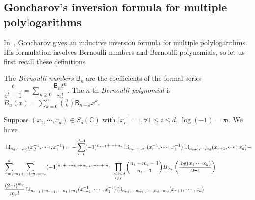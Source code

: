 \subsection{Goncharov's inversion formula for multiple polylogarithms}

In~\cite{Goncharov_MultiplePolylogarithmsAndMixedTateMotives}, Goncharov gives an inductive inversion formula for multiple polylogarithms. His formulation involves Bernoulli numbers and Bernoulli polynomials, so let us first recall these definitions.

\begin{definition}
The \textit{Bernoulli numbers} $\mathsf B_n$ are the coefficients of the formal series $\dfrac{t}{e^t-1}=\sum\limits_{n\geq0}\dfrac{\mathsf B_nt^n}{n!}$. The $n$-th \textit{Bernoulli polynomial} is $B_n(x)=\displaystyle\sum_{k=0}^n\binom{n}{k}\mathsf B_{n-k}x^k$.
\end{definition}


\begin{theorem}\label{thm: Goncharov's inversion formula}\cite{Goncharov_MultiplePolylogarithmsAndMixedTateMotives}
Suppose $(x_1,\cdots,x_d)\in S_d(\mathbb C)$ with $|x_i|=1,\forall 1\leq i\leq d$, $\log(-1)=\pi i$. We have
\begin{equation}\label{eq: Goncharov's inversion formula}
\begin{aligned}
&\operatorname{Li}_{n_d,\cdots,n_1}(x_d^{-1},\cdots,x_1^{-1})=-\sum_{r=0}^{d-1}(-1)^{n_{r+1}+\cdots+n_d}\operatorname{Li}_{n_r,\cdots,n_1}(x_r^{-1},\cdots,x_1^{-1})\operatorname{Li}_{n_{r+1},\cdots,n_d}(x_{r+1},\cdots,x_d)-\\
&\sum_{r=1}^d\sum_{m_1+\cdots+m_d=n_r}(-1)^{n_r+\cdots+n_d+m_{r+1}+\cdots+m_d}\prod_{\substack{1\leq i\leq d\\i\neq r}}\binom{n_i+m_i-1}{n_i-1}B_{m_r}\left(\frac{\log(x_1\cdots x_d)}{2\pi i}\right)\\
&\frac{(2\pi i)^{m_r}}{m_r!}\operatorname{Li}_{n_{r-1}+m_{r-1},\cdots,n_1+m_1}(x_{r-1}^{-1},\cdots,x_1^{-1})\operatorname{Li}_{n_{r+1}+m_{r+1},\cdots,n_d+m_d}(x_{r+1},\cdots,x_d)
\end{aligned}
\end{equation}
\end{theorem}

